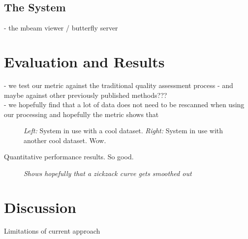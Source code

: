 \documentclass{llncs}
\begin{document}
\subsection{The System}
- the mbeam viewer / butterfly server

\section{Evaluation and Results}

- we test our metric against the traditional quality assessment process
- and maybe against other previously published methods???\\
- we hopefully find that a lot of data does not need to be rescanned when using our processing and hopefully the metric shows that


\begin{figure}
\caption{\emph{Left:} System in use with a cool dataset. \emph{Right:} System in use with another cool dataset. Wow.}
\end{figure}
%
%
%

\begin{table}
\caption{Quantitative performance results. So good.}
\end{table}

\begin{figure}
\caption{\emph{Shows hopefully that a zickzack curve gets smoothed out}}
\end{figure}


\section{Discussion}

Limitations of current approach



%
%
\begin{thebibliography}{}

\end{thebibliography}
\end{document}

